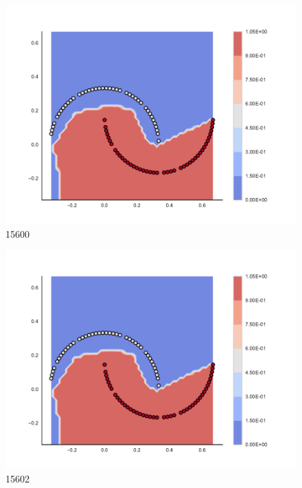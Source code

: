 \begin{subfigure}[b]{0.09\textwidth}
    \includegraphics[clip, trim=2.35cm 1.75cm 4.5cm 0cm,width=\textwidth]{img/convergence/15600.pdf}
    \caption{15600}
    \label{fig:convergence_15600}
\end{subfigure}
%
\begin{subfigure}[b]{0.09\textwidth}
    \includegraphics[clip, trim=2.35cm 1.75cm 4.5cm 0cm,width=\textwidth]{img/convergence/15602.pdf}
    \caption{15602}
    \label{fig:convergence_15602}
\end{subfigure}
%
